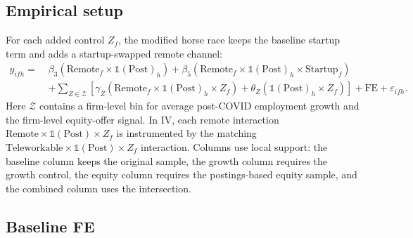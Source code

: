 \documentclass{article}
\newcommand{\cleanedresultsdir}{../../results/cleaned/tex}
\newcommand{\TableInput}[1]{}
\newcommand{\FloatNote}[1]{%
  \begingroup
    \captionsetup{style=noteflush}%
    \caption*{\textit{Notes:}~#1}%
  \endgroup
}
\begin{document}
\subsection*{Empirical setup}
\noindent For each added control $Z_f$, the modified horse race keeps the baseline startup term and adds a startup-swapped remote channel:
\[
  \begin{aligned}
    y_{ifh} =\; & \beta_3 \left( \text{Remote}_f \times \mathds{1}(\text{Post})_h \right)
    + \beta_5 \left( \text{Remote}_f \times \mathds{1}(\text{Post})_h \times \text{Startup}_f \right) \\
    & + \sum_{Z \in \mathcal{Z}} \left[
        \gamma_Z \left( \text{Remote}_f \times \mathds{1}(\text{Post})_h \times Z_f \right)
        + \theta_Z \left( \mathds{1}(\text{Post})_h \times Z_f \right)
      \right]
    + \text{FE} + \varepsilon_{ifh} .
  \end{aligned}
\]
\noindent Here $\mathcal{Z}$ contains a firm-level bin for average post-COVID employment growth and the firm-level equity-offer signal. In IV, each remote interaction $\text{Remote}\times\mathds{1}(\text{Post})\times Z_f$ is instrumented by the matching $\text{Teleworkable}\times\mathds{1}(\text{Post})\times Z_f$ interaction. Columns use local support: the baseline column keeps the original sample, the growth column requires the growth control, the equity column requires the postings-based equity sample, and the combined column uses the intersection.

\subsection*{Baseline FE}
\begin{table}[H]
  \centering
  \caption{User productivity startup-swapped horse race, baseline FE, local-support samples}
  \TableInput{\cleanedresultsdir/llm_equity_postings_coverage_horse_race_baseline.tex}
  \FloatNote{Columns mirror the current baseline-FE horse-race structure: baseline, firm growth only, equity only, and both. The first two rows report the baseline remote coefficients on $\text{Remote}\times\mathds{1}(\text{Post})$ and $\text{Remote}\times\mathds{1}(\text{Post})\times\text{Startup}$. The growth channel uses a firm-level median split of average post-COVID employment growth. The equity channel uses the postings-based equity sample described above. The baseline column is left on the original sample, and the combined column uses the intersection of the growth and equity supports. Standard errors are clustered by worker.}
\end{table}
\end{document}
